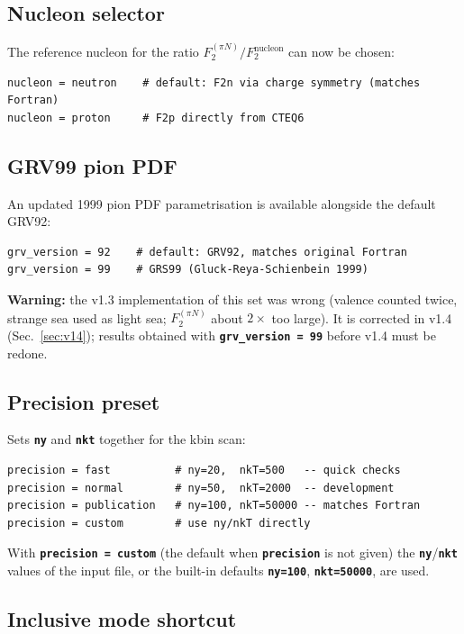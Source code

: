 \documentclass[11pt,a4paper]{article}
\newcommand{\inikey}[1]{\texttt{\textbf{#1}}}
\begin{document}
\subsection{Nucleon selector}

The reference nucleon for the ratio $F_2^{(\pi N)} / F_2^{\text{nucleon}}$
can now be chosen:

\begin{lstlisting}[style=iniStyle]
nucleon = neutron    # default: F2n via charge symmetry (matches Fortran)
nucleon = proton     # F2p directly from CTEQ6
\end{lstlisting}

\subsection{GRV99 pion PDF}

An updated 1999 pion PDF parametrisation is available alongside the
default GRV92:

\begin{lstlisting}[style=iniStyle]
grv_version = 92    # default: GRV92, matches original Fortran
grv_version = 99    # GRS99 (Gluck-Reya-Schienbein 1999)
\end{lstlisting}
\textbf{Warning:} the v1.3 implementation of this set was wrong (valence
counted twice, strange sea used as light sea; $F_2^{(\pi N)}$ about $2\times$
too large).  It is corrected in v1.4 (Sec.~\ref{sec:v14}); results obtained
with \inikey{grv\_version = 99} before v1.4 must be redone.

\subsection{Precision preset}

Sets \inikey{ny} and \inikey{nkt} together for the kbin scan:

\begin{lstlisting}[style=iniStyle]
precision = fast          # ny=20,  nkT=500   -- quick checks
precision = normal        # ny=50,  nkT=2000  -- development
precision = publication   # ny=100, nkT=50000 -- matches Fortran
precision = custom        # use ny/nkT directly
\end{lstlisting}
With \inikey{precision = custom} (the default when \inikey{precision} is
not given) the \inikey{ny}/\inikey{nkt} values of the input file, or the
built-in defaults \inikey{ny=100}, \inikey{nkt=50000}, are used.

\subsection{Inclusive mode shortcut}
\end{document}

